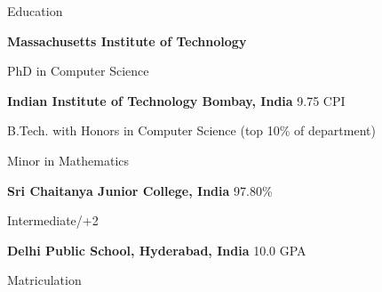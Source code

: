 
\begin{rubric}{Education}

\entry*[2023--Present]%
	\textbf{Massachusetts Institute of Technology}
	\par PhD in Computer Science

\entry*[2019--2023]%
	\textbf{Indian Institute of Technology Bombay, India} \hfill 9.75 CPI
	\par B.Tech. with Honors in Computer Science \hfill (top 10\% of department)
	\par Minor in Mathematics


\entry*[2017--2019]%
	\textbf{Sri Chaitanya Junior College, India} \hfill 97.80\% \par
	Intermediate/+2
	

\entry*[2010--2017]%
	\textbf{Delhi Public School, Hyderabad, India} \hfill 10.0 GPA \par
	Matriculation
\end{rubric}